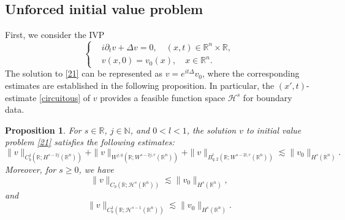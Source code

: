 \documentclass[preprint,compress,12pt]{elsarticle}
\newtheorem{proposition}[theorem]{Proposition}
\numberwithin{equation}{section}
\begin{document}
\subsection{Unforced initial value problem}\label{sec21}
First, we consider the IVP
\begin{equation}\label{21}
	\left\{\begin{aligned}&i\partial_{t}v+\Delta v=0, \quad (x,t)\in \mathbb{R}^n \times \mathbb{R},\\
		&v(x,0)=v_0(x),\quad x\in \mathbb{R}^{n}.
	\end{aligned}\right.
\end{equation}
The solution to \eqref{21} can be represented as $v=e^{it\Delta}v_{0}$, where the corresponding estimates are established in the following proposition. In particular, the $(x',t)$-estimate \eqref{circuitous} of $v$ provides a feasible function space $\mathcal{H}^{s}$ for boundary data.
\begin{proposition}\label{p21}
	For $s\in\mathbb{R}$, $j\in\mathbb{N}$, and $0<l<1$,  the solution $v$ to initial value problem \eqref{21} satisfies the following estimates:
	\begin{equation}\label{autocrat}	\|v\|_{C_{b}^{j}(\mathbb{R};H^{s-2j}(\mathbb{R}^{n}))}+\|v\|_{W^{j,q}(\mathbb{R};W^{s-2j,r}(\mathbb{R}^{n}))}+\|v\|_{B^{l}_{q,2}(\mathbb{R};W^{s-2l,r}(\mathbb{R}^{n}))}\lesssim \|v_{0}\|_{H^{s}(\mathbb{R}^{n})}.
	\end{equation}
	Moreover, for $s\geq0$, we have
	\begin{equation}\label{circuitous}
		\|v\|_{C_{b}(\mathbb{R};\mathcal{H}^{s}(\mathbb{R}^{n}))}\lesssim \|v_0\|_{H^{s}(\mathbb{R}^{n})},
	\end{equation}
	and
	\begin{equation}\label{tentative}
		\|v\|_{C_{b}^{1}(\mathbb{R};\mathcal{H}^{s-1}(\mathbb{R}^{n}))}\lesssim \|v_0\|_{H^{s}(\mathbb{R}^{n})}.
	\end{equation}
\end{proposition}
\end{document}
